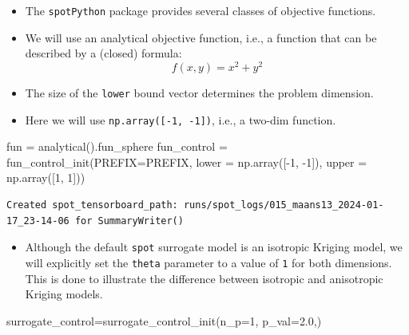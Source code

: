 \documentclass[
  letterpaper,
  DIV=11,
  numbers=noendperiod]{scrreprt}
\newenvironment{Shaded}{\begin{snugshade}}{\end{snugshade}}
\newcommand{\DecValTok}[1]{\textcolor[rgb]{0.68,0.00,0.00}{#1}}
\newcommand{\FloatTok}[1]{\textcolor[rgb]{0.68,0.00,0.00}{#1}}
\newcommand{\NormalTok}[1]{\textcolor[rgb]{0.00,0.23,0.31}{#1}}
\newcommand{\OperatorTok}[1]{\textcolor[rgb]{0.37,0.37,0.37}{#1}}
\providecommand{\tightlist}{%
  \setlength{\itemsep}{0pt}\setlength{\parskip}{0pt}}\usepackage{longtable,booktabs,array}
\begin{document}
\begin{itemize}
\tightlist
\item
  The \texttt{spotPython} package provides several classes of objective
  functions.
\item
  We will use an analytical objective function, i.e., a function that
  can be described by a (closed) formula: \[f(x, y) = x^2 + y^2\]
\item
  The size of the \texttt{lower} bound vector determines the problem
  dimension.
\item
  Here we will use \texttt{np.array({[}-1,\ -1{]})}, i.e., a two-dim
  function.
\end{itemize}

\begin{Shaded}
\begin{Highlighting}[]
\NormalTok{fun }\OperatorTok{=}\NormalTok{ analytical().fun\_sphere}
\NormalTok{fun\_control }\OperatorTok{=}\NormalTok{ fun\_control\_init(PREFIX}\OperatorTok{=}\NormalTok{PREFIX,}
\NormalTok{                               lower }\OperatorTok{=}\NormalTok{ np.array([}\OperatorTok{{-}}\DecValTok{1}\NormalTok{, }\OperatorTok{{-}}\DecValTok{1}\NormalTok{]),}
\NormalTok{                               upper }\OperatorTok{=}\NormalTok{ np.array([}\DecValTok{1}\NormalTok{, }\DecValTok{1}\NormalTok{]))}
\end{Highlighting}
\end{Shaded}

\begin{verbatim}
Created spot_tensorboard_path: runs/spot_logs/015_maans13_2024-01-17_23-14-06 for SummaryWriter()
\end{verbatim}

\begin{itemize}
\tightlist
\item
  Although the default \texttt{spot} surrogate model is an isotropic
  Kriging model, we will explicitly set the \texttt{theta} parameter to
  a value of \texttt{1} for both dimensions. This is done to illustrate
  the difference between isotropic and anisotropic Kriging models.
\end{itemize}

\begin{Shaded}
\begin{Highlighting}[]
\NormalTok{surrogate\_control}\OperatorTok{=}\NormalTok{surrogate\_control\_init(n\_p}\OperatorTok{=}\DecValTok{1}\NormalTok{,}
\NormalTok{                                         p\_val}\OperatorTok{=}\FloatTok{2.0}\NormalTok{,)}
\end{Highlighting}
\end{Shaded}
\end{document}
